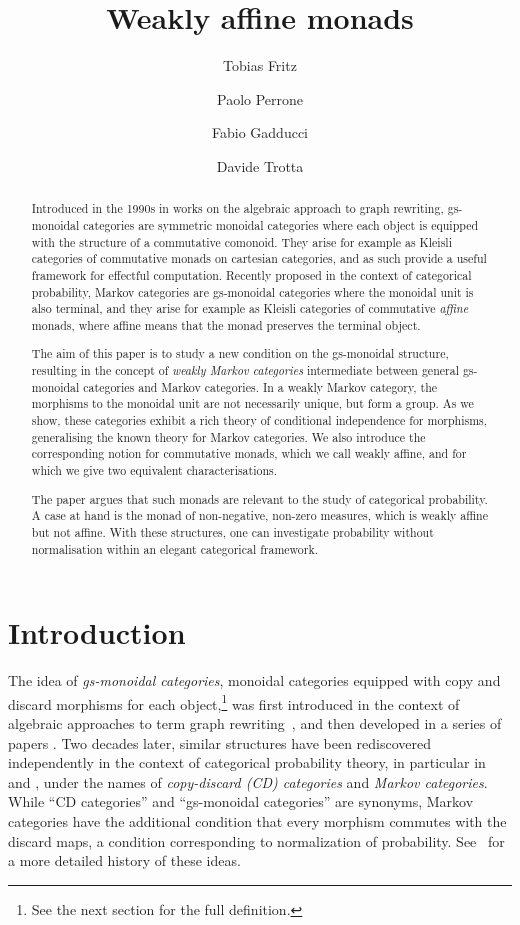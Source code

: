 \documentclass[a4paper,UKenglish,numberwithinsect,cleveref, autoref, thm-restate]{lipics-v2021}
\title{Weakly affine monads}
\author{Tobias Fritz}{Department of Mathematics, University of Innsbruck, AT}{
ias.fritz@uibk.ac.at}{}{}
\author{Paolo Perrone}{Department of Computer Science, University of Oxford, UK}{paolo.perrone@cs.ox.ac.uk}{https://orcid.org/0000-0002-9123-9089}{}
\author{Fabio Gadducci}{Department of Computer Science, University of Pisa, Pisa, IT}{fabio.gadducci@unipi.it}{https://orcid.org/
0000-0003-0690-3051}{}
\author{ Davide Trotta }{Department of Computer Science, University of Pisa, Pisa, IT}{trottadavide92@gmail.com}{https://orcid.org/0000-0003-4509-594X}{}
\theoremstyle{plain} %
\theoremstyle{definition} %
\begin{document}
\maketitle

\begin{abstract}
   Introduced in the 1990s in works on the algebraic approach to graph rewriting, 
   gs-monoidal categories are symmetric monoidal categories 
   where each object is equipped with the structure of a commutative comonoid. They arise for example as 
   Kleisli categories of commutative monads on cartesian categories, 
   and as such provide a useful framework for effectful computation. 
   Recently proposed in the context of categorical probability, Markov categories are
   gs-monoidal categories where the monoidal unit is also terminal, and they arise for example as
   Kleisli categories of commutative \emph{affine} monads, where affine means that the monad preserves the terminal object.

   The aim of this paper is to study a new condition on the gs-monoidal structure, resulting in the concept of \emph{weakly Markov categories} intermediate between general 
   gs-monoidal categories and Markov categories. 
   In a weakly Markov category, the morphisms to the monoidal unit are not necessarily unique, but form a group.
   As we show, these categories exhibit a 
   rich theory of conditional independence for morphisms, generalising the known theory for Markov categories. We also introduce the corresponding 
   notion for commutative monads, which we call weakly affine, and for which we give two equivalent
   characterisations.

   The paper argues that such monads are relevant to the study of categorical probability.
   A case at hand is the monad of non-negative, non-zero measures, which is weakly affine but not affine. 
   With these structures, one can investigate probability without normalisation within an elegant categorical framework.
\end{abstract}

\section{Introduction}

The idea of \emph{gs-monoidal categories}, monoidal categories equipped with copy and discard morphisms for each object,\footnote{See the next section for the full definition.} was first introduced in the context of algebraic approaches to term graph rewriting~\cite{CorradiniGadducci97}, and then
developed in a series of papers \cite{CorradiniGadducci99, CorradiniGadducci02, CorradiniGadducci99b}.
Two decades later, similar structures have been rediscovered independently in the context of categorical probability theory, in particular in \cite{cho_jacobs_2019} and \cite{Fritz_2020}, under the names of \emph{copy-discard (CD) categories} and \emph{Markov categories}.
While ``CD categories'' and ``gs-monoidal categories'' are synonyms, Markov categories have the additional condition that every morphism commutes with the discard maps, a condition corresponding to normalization of probability. See~\cite[Remark~2.2]{fritz2022} for a more detailed history of these ideas. 
\end{document}
